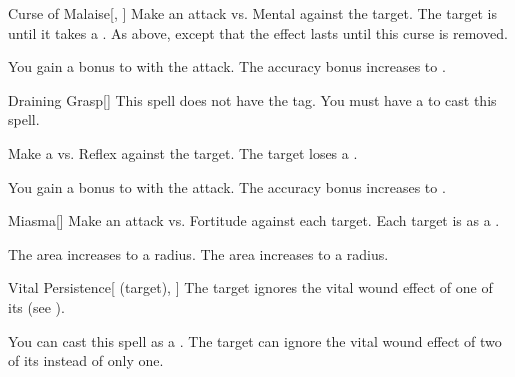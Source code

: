 \lowercase{\hypertarget{spell:Curse of Malaise}{}}\label{spell:Curse of Malaise}
\begin{freeability}[Rank 3]{\hypertarget{spell:Curse of Malaise}{Curse of Malaise}}[, ]
Make an attack vs. Mental against the target.
\hit The target is  until it takes a .
\crit As above, except that the effect lasts until this curse is removed.

\rankline
{} You gain a  bonus to  with the attack.
 The accuracy bonus increases to .
\end{freeability}
\vspace{0.25em}



\lowercase{\hypertarget{spell:Draining Grasp}{}}\label{spell:Draining Grasp}
\begin{freeability}[Rank 3]{\hypertarget{spell:Draining Grasp}{Draining Grasp}}[]
This spell does not have the  tag.
You must have a  to cast this spell.

Make a  vs. Reflex against the target.
\hit The target loses a .

\rankline
{} You gain a  bonus to  with the attack.
 The accuracy bonus increases to .
\end{freeability}
\vspace{0.25em}



\lowercase{\hypertarget{spell:Miasma}{}}\label{spell:Miasma}
\begin{freeability}[Rank 3]{\hypertarget{spell:Miasma}{Miasma}}[]
Make an attack vs. Fortitude against each target.
\hit Each target is  as a .

\rankline
{} The area increases to a \arealarge radius.
 The area increases to a \areahuge radius.
\end{freeability}
\vspace{0.25em}



\lowercase{\hypertarget{spell:Vital Persistence}{}}\label{spell:Vital Persistence}
\begin{attuneability}[Rank 3]{\hypertarget{spell:Vital Persistence}{Vital Persistence}}[ (target), ]
The target ignores the vital wound effect of one of its  (see ).

\rankline
{} You can cast this spell as a .
 The target can ignore the vital wound effect of two of its  instead of only one.
\end{attuneability}
\vspace{0.25em}



